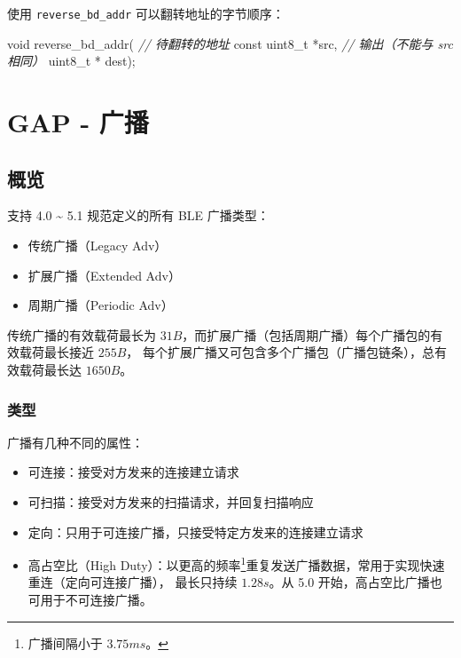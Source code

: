 \documentclass[
  12pt,
]{book}
\newenvironment{Shaded}{\begin{snugshade}}{\end{snugshade}}
\newcommand{\CommentTok}[1]{\textcolor[rgb]{0.56,0.35,0.01}{\textit{#1}}}
\newcommand{\DataTypeTok}[1]{\textcolor[rgb]{0.13,0.29,0.53}{#1}}
\newcommand{\NormalTok}[1]{#1}
\providecommand{\tightlist}{%
  \setlength{\itemsep}{0pt}\setlength{\parskip}{0pt}}
\begin{document}
使用 \texttt{reverse\_bd\_addr} 可以翻转地址的字节顺序：

\begin{Shaded}
\begin{Highlighting}[]
\DataTypeTok{void}\NormalTok{ reverse_bd_addr(}
    \CommentTok{// 待翻转的地址}
    \DataTypeTok{const} \DataTypeTok{uint8_t}\NormalTok{ *src,}
    \CommentTok{// 输出（不能与 src 相同）}
    \DataTypeTok{uint8_t}\NormalTok{ * dest);}
\end{Highlighting}
\end{Shaded}

\hypertarget{ch-adv}{%
\chapter{GAP - 广播}\label{ch-adv}}

\hypertarget{ux6982ux89c8}{%
\section{概览}\label{ux6982ux89c8}}

支持 4.0 \textasciitilde{} 5.1 规范定义的所有 BLE 广播类型：

\begin{itemize}
\tightlist
\item
  传统广播（Legacy Adv）
\item
  扩展广播（Extended Adv）
\item
  周期广播（Periodic Adv）
\end{itemize}

传统广播的有效载荷最长为 \(31B\)，而扩展广播（包括周期广播）每个广播包的有效载荷最长接近 \(255B\)，
每个扩展广播又可包含多个广播包（广播包链条），总有效载荷最长达 \(1650B\)。

\hypertarget{ux7c7bux578b}{%
\subsection{类型}\label{ux7c7bux578b}}

广播有几种不同的属性：

\begin{itemize}
\item
  可连接：接受对方发来的连接建立请求
\item
  可扫描：接受对方发来的扫描请求，并回复扫描响应
\item
  定向：只用于可连接广播，只接受特定方发来的连接建立请求
\item
  高占空比（High Duty）：以更高的频率\footnote{广播间隔小于 \(3.75ms\)。}重复发送广播数据，常用于实现快速重连（定向可连接广播），
  最长只持续 \(1.28s\)。从 5.0 开始，高占空比广播也可用于不可连接广播。
\end{itemize}
\end{document}
